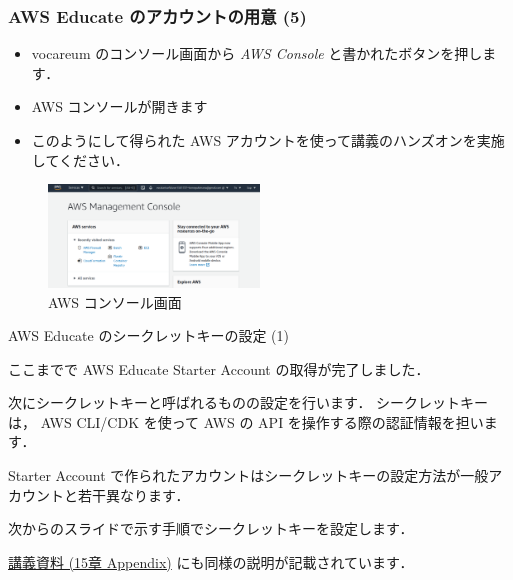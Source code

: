 \documentclass[unicode,11pt]{beamer}
\begin{document}
\begin{frame}
\frametitle{AWS Educate のアカウントの用意 (5)}

\begin{itemize}
    \item vocareum のコンソール画面から \emph{AWS Console} と書かれたボタンを押します．
    \item AWS コンソールが開きます
    \item このようにして得られた AWS アカウントを使って講義のハンズオンを実施してください．
\end{itemize}

\begin{figure}
    \centering
    \includegraphics[width=0.5\textwidth]{imgs/aws_console_screenshot.png}
    \caption{AWS コンソール画面}
\end{figure}

\end{frame}

\begin{frame}{AWS Educate のシークレットキーの設定 (1)}

ここまでで AWS Educate Starter Account の取得が完了しました．

次にシークレットキーと呼ばれるものの設定を行います．
シークレットキーは， AWS CLI/CDK を使って AWS の API を操作する際の認証情報を担います．

Starter Account で作られたアカウントはシークレットキーの設定方法が一般アカウントと若干異なります．

次からのスライドで示す手順でシークレットキーを設定します．

\href{https://tomomano.github.io/learn-aws-by-coding/}{講義資料 (15章 Appendix)} にも同様の説明が記載されています．
    
\end{frame}
\end{document}

